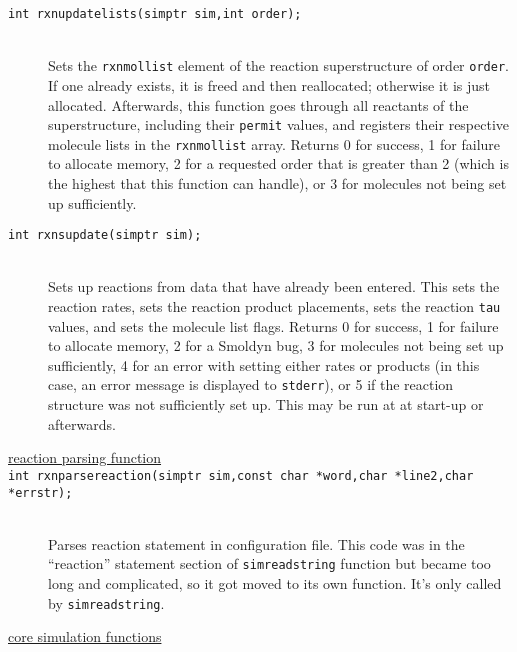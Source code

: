 \documentclass {book}
\newcommand {\ttt} {\texttt}
\begin{document}
\begin{description}
\item[\ttt{int rxnupdatelists(simptr sim,int order);}]
\hfill \\
Sets the \ttt{rxnmollist} element of the reaction superstructure of order \ttt{order}. If one already exists, it is freed and then reallocated; otherwise it is just allocated. Afterwards, this function goes through all reactants of the superstructure, including their \ttt{permit} values, and registers their respective molecule lists in the \ttt{rxnmollist} array. Returns 0 for success, 1 for failure to allocate memory, 2 for a requested order that is greater than 2 (which is the highest that this function can handle), or 3 for molecules not being set up sufficiently.

\item[\ttt{int rxnsupdate(simptr sim);}]
\hfill \\
Sets up reactions from data that have already been entered. This sets the reaction rates, sets the reaction product placements, sets the reaction \ttt{tau} values, and sets the molecule list flags. Returns 0 for success, 1 for failure to allocate memory, 2 for a Smoldyn bug, 3 for molecules not being set up sufficiently, 4 for an error with setting either rates or products (in this case, an error message is displayed to \ttt{stderr}), or 5 if the reaction structure was not sufficiently set up. This may be run at at start-up or afterwards.

\item[\underline{reaction parsing function}]

\item[\ttt{int rxnparsereaction(simptr sim,const char *word,char *line2,char *errstr);}]
\hfill \\
Parses reaction statement in configuration file. This code was in the ``reaction'' statement section of \ttt{simreadstring} function but became too long and complicated, so it got moved to its own function. It's only called by \ttt{simreadstring}.

\item[\underline{core simulation functions}]


\end{description}
\end{document}
